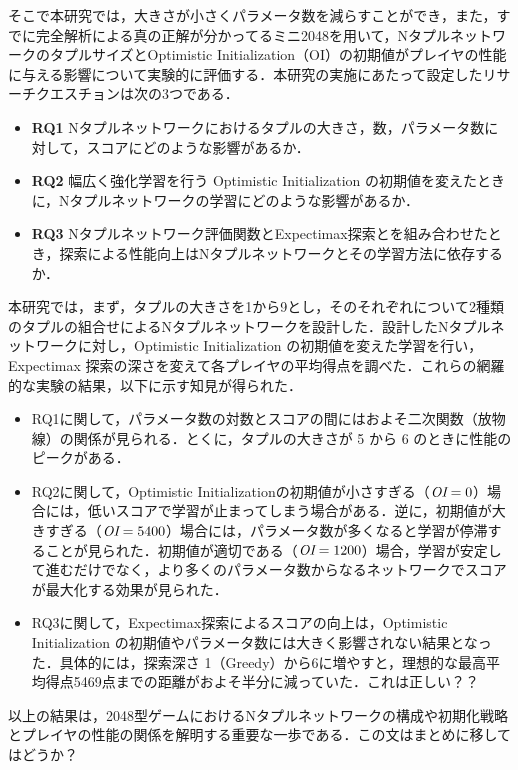 そこで本研究では，大きさが小さくパラメータ数を減らすことができ，また，すでに完全解析による真の正解が分かってるミニ2048を用いて，NタプルネットワークのタプルサイズとOptimistic Initialization（OI）の初期値がプレイヤの性能に与える影響について実験的に評価する．本研究の実施にあたって設定したリサーチクエスチョンは次の3つである．
\begin{itemize}
\item \textbf{RQ1} Nタプルネットワークにおけるタプルの大きさ，数，パラメータ数に対して，スコアにどのような影響があるか．
\item \textbf{RQ2} 幅広く強化学習を行う Optimistic Initialization の初期値を変えたときに，Nタプルネットワークの学習にどのような影響があるか．
\item \textbf{RQ3} Nタプルネットワーク評価関数とExpectimax探索とを組み合わせたとき，探索による性能向上はNタプルネットワークとその学習方法に依存するか．
\end{itemize}

本研究では，まず，タプルの大きさを1から9とし，そのそれぞれについて2種類のタプルの組合せによるNタプルネットワークを設計した．設計したNタプルネットワークに対し，Optimistic Initialization の初期値を変えた学習を行い，Expectimax 探索の深さを変えて各プレイヤの平均得点を調べた．これらの網羅的な実験の結果，以下に示す知見が得られた．
\begin{itemize}
\item RQ1に関して，パラメータ数の対数とスコアの間にはおよそ二次関数（放物線）の関係が見られる．とくに，タプルの大きさが 5 から 6 のときに性能のピークがある．
\item RQ2に関して，Optimistic Initializationの初期値が小さすぎる（$\mbox{\itshape OI} = 0$）場合には，低いスコアで学習が止まってしまう場合がある．逆に，初期値が大きすぎる（$\mbox{\itshape OI} = 5400$）場合には，パラメータ数が多くなると学習が停滞することが見られた．初期値が適切である（$\mbox{\itshape OI} = 1200$）場合，学習が安定して進むだけでなく，より多くのパラメータ数からなるネットワークでスコアが最大化する効果が見られた．
\item RQ3に関して，Expectimax探索によるスコアの向上は，Optimistic Initialization の初期値やパラメータ数には大きく影響されない結果となった．具体的には，探索深さ  1（Greedy）から6に増やすと，理想的な最高平均得点5469点までの距離がおよそ半分に減っていた．{\color{red}これは正しい？？}
\end{itemize}

以上の結果は，2048型ゲームにおけるNタプルネットワークの構成や初期化戦略とプレイヤの性能の関係を解明する重要な一歩である．{\color{red}この文はまとめに移してはどうか？}